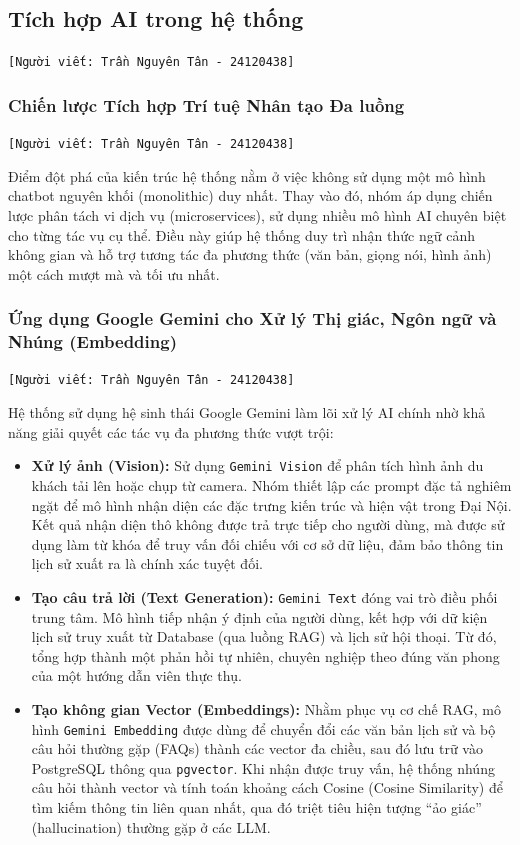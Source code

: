 \subsection{Tích hợp AI trong hệ thống}
\texttt{[Người viết: Trần Nguyên Tân - 24120438]}

\subsubsection{Chiến lược Tích hợp Trí tuệ Nhân tạo Đa luồng}
\texttt{[Người viết: Trần Nguyên Tân - 24120438]}

Điểm đột phá của kiến trúc hệ thống nằm ở việc không sử dụng một mô hình chatbot nguyên khối (monolithic) duy nhất. Thay vào đó, nhóm áp dụng chiến lược phân tách vi dịch vụ (microservices), sử dụng nhiều mô hình AI chuyên biệt cho từng tác vụ cụ thể. Điều này giúp hệ thống duy trì nhận thức ngữ cảnh không gian và hỗ trợ tương tác đa phương thức (văn bản, giọng nói, hình ảnh) một cách mượt mà và tối ưu nhất.

\subsubsection{Ứng dụng Google Gemini cho Xử lý Thị giác, Ngôn ngữ và Nhúng (Embedding)}
\texttt{[Người viết: Trần Nguyên Tân - 24120438]}

Hệ thống sử dụng hệ sinh thái Google Gemini làm lõi xử lý AI chính nhờ khả năng giải quyết các tác vụ đa phương thức vượt trội:

\begin{itemize}
    \item \textbf{Xử lý ảnh (Vision):} Sử dụng \texttt{Gemini Vision} để phân tích hình ảnh du khách tải lên hoặc chụp từ camera. Nhóm thiết lập các prompt đặc tả nghiêm ngặt để mô hình nhận diện các đặc trưng kiến trúc và hiện vật trong Đại Nội. Kết quả nhận diện thô không được trả trực tiếp cho người dùng, mà được sử dụng làm từ khóa để truy vấn đối chiếu với cơ sở dữ liệu, đảm bảo thông tin lịch sử xuất ra là chính xác tuyệt đối.
    \item \textbf{Tạo câu trả lời (Text Generation):} \texttt{Gemini Text} đóng vai trò điều phối trung tâm. Mô hình tiếp nhận ý định của người dùng, kết hợp với dữ kiện lịch sử truy xuất từ Database (qua luồng RAG) và lịch sử hội thoại. Từ đó, tổng hợp thành một phản hồi tự nhiên, chuyên nghiệp theo đúng văn phong của một hướng dẫn viên thực thụ.
    \item \textbf{Tạo không gian Vector (Embeddings):} Nhằm phục vụ cơ chế RAG, mô hình \texttt{Gemini Embedding} được dùng để chuyển đổi các văn bản lịch sử và bộ câu hỏi thường gặp (FAQs) thành các vector đa chiều, sau đó lưu trữ vào PostgreSQL thông qua \texttt{pgvector}. Khi nhận được truy vấn, hệ thống nhúng câu hỏi thành vector và tính toán khoảng cách Cosine (Cosine Similarity) để tìm kiếm thông tin liên quan nhất, qua đó triệt tiêu hiện tượng ``ảo giác'' (hallucination) thường gặp ở các LLM.
\end{itemize}

